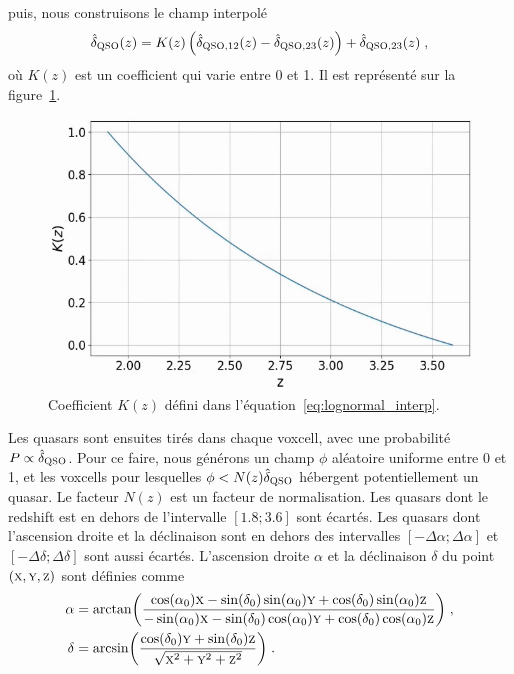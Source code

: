 \documentclass[11pt, twoside, a4paper, openright]{report}
\begin{document}
puis, nous construisons le champ interpolé
\begin{equation}
  \label{eq:lognormal_interp}
 \hat \delta_{\textsc{QSO}}(z) = K(z) \left(\hat \delta_{\textsc{QSO}, 12}(z) - \hat \delta_{\textsc{QSO}, 23}(z)\right) + \hat \delta_{\textsc{QSO}, 23}(z) \; ,
\end{equation}
où $K(z)$ est un coefficient qui varie entre 0 et 1. Il est représenté sur la figure~\ref{fig:kz}.
\begin{figure}
  \centering
  \label{fig:kz}
  \includegraphics[scale=0.4]{kz}
  \caption{Coefficient $K(z)$ défini dans l'équation~\ref{eq:lognormal_interp}.}
\end{figure}
Les quasars sont ensuites tirés dans chaque voxcell, avec une probabilité $P \propto \hat \delta_{\textsc{QSO}}$. Pour ce faire, nous générons un champ $\phi$ aléatoire uniforme entre 0 et 1, et les voxcells pour lesquelles $\phi < N(z) \hat \delta_{\textsc{QSO}}$ hébergent potentiellement un quasar. Le facteur $N(z)$ est un facteur de normalisation. Les quasars dont le redshift est en dehors de l'intervalle $[\num{1.8}; \num{3.6}]$ sont écartés.
Les quasars dont l'ascension droite et la déclinaison sont en dehors des intervalles $[ - \Delta \alpha ; \Delta \alpha]$ et $[ - \Delta \delta ; \Delta \delta]$ sont aussi écartés.
L'ascension droite $\alpha$ et la déclinaison $\delta$ du point $(\textsc{x},\textsc{y},\textsc{z})$ sont définies comme
\begin{align}
  \label{eq:radec}
  \alpha &= \arctan(\frac{
  \cos(\alpha_0)\textsc{x} - \sin(\delta_0)\sin(\alpha_0)\textsc{y} + \cos(\delta_0)\sin(\alpha_0)\textsc{z}
  }{
  - \sin(\alpha_0)\textsc{x} - \sin(\delta_0)\cos(\alpha_0)\textsc{y} + \cos(\delta_0)\cos(\alpha_0)\textsc{z}
           }) \; ,\\
  \delta &= \arcsin(\frac{
           \cos(\delta_0)\textsc{y} + \sin(\delta_0) \textsc{z}
           }{
           \sqrt{\textsc{x}^2 + \textsc{y}^2 + \textsc{z}^2}
           }) \; .
\end{align}
\end{document}
